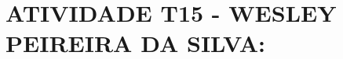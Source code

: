 \documentclass{article}
\begin{document}
\date{\today}

\section*{ATIVIDADE T15 - WESLEY PEIREIRA DA SILVA: {\taskName}}

\small\emph{\serverTime}

\begin{center}






\end{center}
\end{document}
